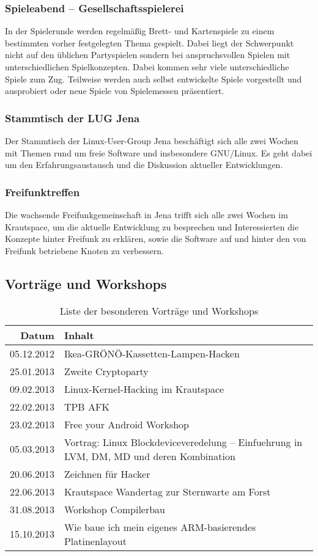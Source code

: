 \documentclass[10pt,DIV16]{scrartcl}
\begin{document}
\subsubsection{Spieleabend -- Gesellschaftsspielerei}

In der Spielerunde werden regelmäßig Brett- und Kartenspiele zu einem 
bestimmten vorher festgelegten Thema gespielt. Dabei liegt der Schwerpunkt 
nicht auf den üblichen Partyspielen sondern bei anspruchsvollen Spielen mit 
unterschiedlichen Spielkonzepten. Dabei kommen sehr viele unterschiedliche 
Spiele zum Zug. Teilweise werden auch selbst entwickelte Spiele vorgestellt 
und ausprobiert oder neue Spiele von Spielemessen präsentiert. 

\subsubsection{Stammtisch der LUG Jena}

Der Stammtisch der Linux-User-Group Jena beschäftigt sich alle zwei Wochen 
mit Themen rund um freie Software und insbesondere GNU/Linux. Es geht dabei 
um den Erfahrungsaustausch und die Diskussion aktueller Entwicklungen. 

\subsubsection{Freifunktreffen}

Die wachsende Freifunkgemeinschaft in Jena trifft sich alle zwei Wochen 
im Krautspace, um die aktuelle Entwicklung zu besprechen und 
Interessierten die Konzepte hinter Freifunk zu erklären, sowie die 
Software auf und hinter den von Freifunk betriebene Knoten zu 
verbessern.

\subsection{Vorträge und Workshops}

\begin{table}[h]
\begin{tabular}{r|l}
	\textbf{Datum} & \textbf{Inhalt} \\ \hline{}
	05.12.2012 & Ikea-GRÖNÖ-Kassetten-Lampen-Hacken\\
    25.01.2013 & Zweite Cryptoparty\\
	09.02.2013 & Linux-Kernel-Hacking im Krautspace\\
	22.02.2013 & TPB AFK\\
	23.02.2013 & Free your Android Workshop\\
	05.03.2013 & Vortrag: Linux Blockdeviceveredelung -- Einfuehrung in LVM, DM, MD und deren Kombination\\
	20.06.2013 & Zeichnen für Hacker\\
	22.06.2013 & Krautspace Wandertag zur Sternwarte am Forst\\
	31.08.2013 & Workshop Compilerbau\\
	15.10.2013 & Wie baue ich mein eigenes ARM-basierendes Platinenlayout
	\end{tabular}
	\caption{Liste der besonderen Vorträge und Workshops}
\end{table}
\end{document}
